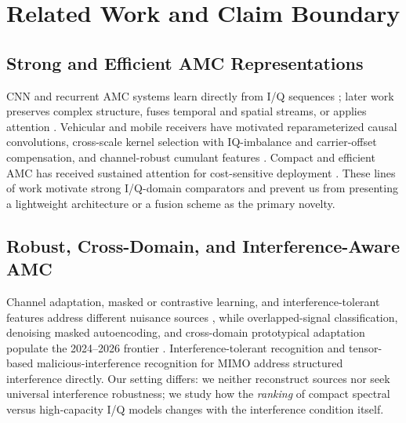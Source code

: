 \documentclass[letterpaper,journal]{IEEEtran}
\begin{document}
\section{Related Work and Claim Boundary}
\subsection{Strong and Efficient AMC Representations}
CNN and recurrent AMC systems learn directly from I/Q sequences
\cite{oshea2016cnn,meng2018amc,xu2020mcldnn}; later work preserves complex
structure, fuses temporal and spatial streams, or applies attention
\cite{tu2020complex,zhang2020dual,cai2022transformer,shao2025iqformer}.
Vehicular and mobile receivers have motivated reparameterized causal
convolutions, cross-scale kernel selection with IQ-imbalance and
carrier-offset compensation, and channel-robust cumulant
features \cite{tang2024repccnet,ren2024crosssknet,huang2024csqcc}. Compact and
efficient AMC has received sustained attention for cost-sensitive deployment
\cite{wang2020lightamc,efficientamc2026tgcn}. These lines of work
motivate strong I/Q-domain comparators and prevent us from presenting a
lightweight architecture or a fusion scheme as the primary novelty.

\subsection{Robust, Cross-Domain, and Interference-Aware AMC}
Channel adaptation, masked or contrastive learning, and interference-tolerant
features address different nuisance sources
\cite{wang2024sigda,xiao2024mclhn,du2025contrastive,sun2025mfenet}, while
overlapped-signal classification, denoising masked autoencoding, and
cross-domain prototypical adaptation populate the 2024--2026 frontier
\cite{jajoo2024overlapped,faysal2026denomae,li2026cgpcda}. Interference-tolerant
recognition \cite{sun2025mfenet} and tensor-based malicious-interference
recognition for MIMO \cite{zhang2026malicious} address structured interference
directly. Our setting differs: we neither reconstruct sources nor seek universal
interference robustness; we study how the \emph{ranking} of compact spectral versus
high-capacity I/Q models changes with the interference condition itself.
\end{document}
